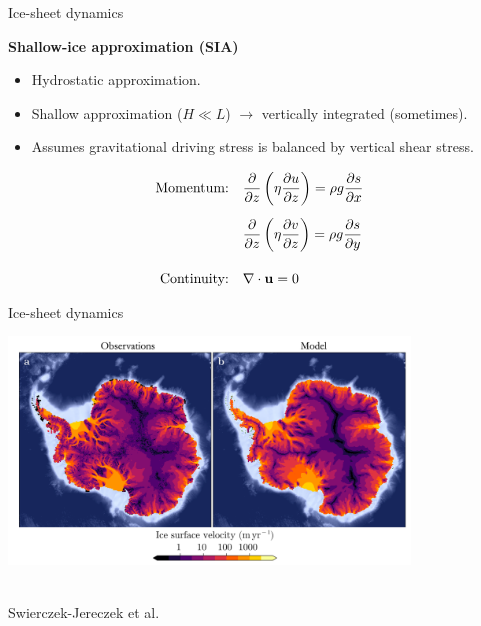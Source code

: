 \documentclass[aspectratio=169,xcolor=dvipsnames]{beamer}
\newcommand\credit[2]{
        \\ \vspace{-0.5em}
        {\color{gray}\scriptsize
        \hfill
        #1
        \hspace{#2}}
        }
\begin{document}
\begin{frame}[t]{Ice-sheet dynamics}

    \vspace{-1.0em}

    \begin{center}
    \textbf{{\large
    Shallow-ice approximation (SIA)
    }}
    \end{center}
    
    \small 
    \center 
    
    \vspace{-0.5em}
    
    \begin{itemize}
        \item Hydrostatic approximation.
        \item Shallow approximation ($H \ll L$) $\rightarrow$ vertically integrated (sometimes).
        \item Assumes gravitational driving stress is balanced by vertical shear stress.
    \end{itemize}

    \begin{align*}
        \text{Momentum:}& \quad 
        \pdv{}{z} \left( \eta \pdv{u}{z} \right) = \rho g \pdv{s}{x} \\[0.5em]
        & \quad
        \pdv{}{z} \left( \eta \pdv{v}{z} \right) = \rho g \pdv{s}{y} \\[1em]
        \text{Continuity:}& \quad
        \nabla \cdot \mathbf{u} = 0
    \end{align*}

\end{frame}

\begin{frame}{Ice-sheet dynamics}
\begin{center}

\includegraphics[width=0.8\textwidth]{figs/Fig-Antarctica-surface-velocity-with-model.png}
\credit{Swierczek-Jereczek et al.}{10pt}

\end{center}
\end{frame}
\end{document}

